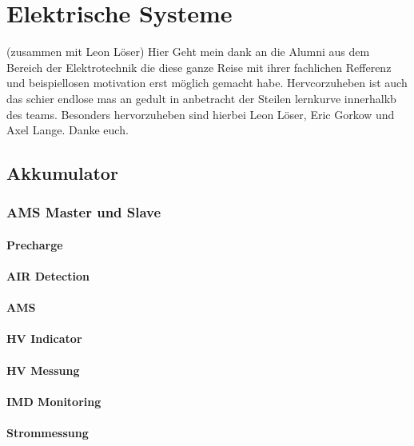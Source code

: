 
\chapter{Elektrische Systeme} (zusammen mit Leon Löser)
Hier Geht mein dank an die Alumni aus dem Bereich der Elektrotechnik die diese ganze Reise mit ihrer fachlichen Refferenz und beispiellosen motivation erst möglich gemacht habe. Hervcorzuheben ist auch das schier endlose mas an gedult in anbetracht der Steilen lernkurve innerhalkb des teams. Besonders hervorzuheben sind hierbei Leon Löser, Eric Gorkow und Axel Lange. Danke euch.
\section{Akkumulator}

\subsection{AMS Master und Slave}

\subsubsection{Precharge}

\subsubsection{AIR Detection}

\subsubsection{AMS}

\subsubsection{HV Indicator}

\subsubsection{HV Messung}

\subsubsection{IMD Monitoring}

\subsubsection{Strommessung}

